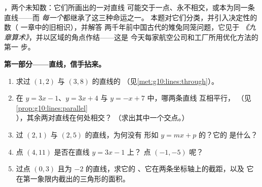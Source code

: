 \begin{problem}
\label{pb:g10:lines:1}
，两个未知数：它们所画出的一对直线
可能交于一点、永不相交，或本为同一条直线——而
\emph{每一个}都继承了这三种命运之一。
本题对它们分类，并引入决定性的数（
一章中的旧相识），并解答
两千年前中国古代的雉兔同笼问题，它见于
\emph{《九章算术》}，并以区域的角点作结——这是
今天每家航空公司和工厂所用优化方法的第一
步。

\medskip
\noindent\textbf{第一部分——直线，信手拈来。}
\begin{enumerate}
  \item 求过
        $(1, 2)$ 与 $(3, 8)$ 的直线的
        （见\cref{met:g10:lines:through}）。
  \item 在 $y = 3x - 1$、$y = 3x + 4$ 与 $y = -x + 7$ 中，哪两条直线
        互相平行，
        （见\cref{prop:g10:lines:parallel}），其余两对直线在何处相交？
        （求出其中一个交点。）
  \item 过 $(2, 1)$ 与 $(2, 5)$ 的直线，为何没有
        形如 $y = mx + p$ 的？它的
        是什么？
  \item 点 $(4, 11)$ 是否在直线 $y = 3x - 1$ 上？
        点 $(-1, -5)$ 呢？
  \item 过点 $(0, 3)$ 且为 $-2$ 的直线，求它的
        、它在两条坐标轴上的截距，以及
        它在第一象限内截出的三角形的面积。
\end{enumerate}


\end{problem}

